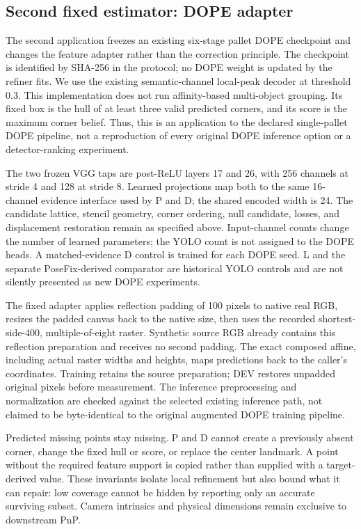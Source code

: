 \documentclass[journal]{IEEEtran}
\begin{document}
\subsection{Second fixed estimator: DOPE adapter}
The second application freezes an existing six-stage pallet DOPE checkpoint and changes the feature adapter rather than the correction principle. The checkpoint is identified by SHA-256 in the protocol; no DOPE weight is updated by the refiner fits. We use the existing semantic-channel local-peak decoder at threshold 0.3. This implementation does not run affinity-based multi-object grouping. Its fixed box is the hull of at least three valid predicted corners, and its score is the maximum corner belief. Thus, this is an application to the declared single-pallet DOPE pipeline, not a reproduction of every original DOPE inference option or a detector-ranking experiment.

The two frozen VGG taps are post-ReLU layers 17 and 26, with 256 channels at stride 4 and 128 at stride 8. Learned projections map both to the same 16-channel evidence interface used by P and D; the shared encoded width is 24. The candidate lattice, stencil geometry, corner ordering, null candidate, losses, and displacement restoration remain as specified above. Input-channel counts change the number of learned parameters; the YOLO count is not assigned to the DOPE heads. A matched-evidence D control is trained for each DOPE seed. L and the separate PoseFix-derived comparator are historical YOLO controls and are not silently presented as new DOPE experiments.

The fixed adapter applies reflection padding of 100 pixels to native real RGB, resizes the padded canvas back to the native size, then uses the recorded shortest-side-400, multiple-of-eight raster. Synthetic source RGB already contains this reflection preparation and receives no second padding. The exact composed affine, including actual raster widths and heights, maps predictions back to the caller's coordinates. Training retains the source preparation; DEV restores unpadded original pixels before measurement. The inference preprocessing and normalization are checked against the selected existing inference path, not claimed to be byte-identical to the original augmented DOPE training pipeline.

Predicted missing points stay missing. P and D cannot create a previously absent corner, change the fixed hull or score, or replace the center landmark. A point without the required feature support is copied rather than supplied with a target-derived value. These invariants isolate local refinement but also bound what it can repair: low coverage cannot be hidden by reporting only an accurate surviving subset. Camera intrinsics and physical dimensions remain exclusive to downstream PnP.
\end{document}
